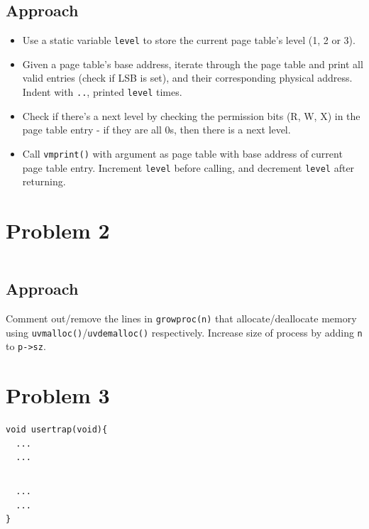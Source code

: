 \documentclass[11pt,a4paper,english]{paper}
\newenvironment{colorboxed}[4][gray]{
\begin{tcolorbox}[colback=#1!3!white,colframe=#1(ryb)!50!black,title=\textbf{#2: #3},#4]
}{
\end{tcolorbox}
}
\begin{document}
\subsection{Approach}
\begin{itemize}[noitemsep, nolistsep]
    \item Use a static variable \texttt{level} to store the current page table's level (1, 2 or 3).
    \item Given a page table's base address, iterate through the page table and print all valid entries (check if LSB is set), and their corresponding physical address. Indent with \texttt{..}, printed \texttt{level} times.
    \item Check if there's a next level by checking the permission bits (R, W, X) in the page table entry - if they are all 0s, then there is a next level.
    \item Call \texttt{vmprint()} with argument as page table with base address of current page table entry. Increment \texttt{level} before calling, and decrement \texttt{level} after returning.
\end{itemize}

\section{Problem 2}
\begin{colorboxed}{Code}{\texttt{kernel/proc.c::growproc()}}{unbreakable}
    \inputminted[baselinestretch=0.85,firstline=232,lastline=248,breaklines]{c}{kernel/proc.c}
\end{colorboxed}
\subsection{Approach}
Comment out/remove the lines in \texttt{growproc(n)} that allocate/deallocate memory using \texttt{uvmalloc()}/\texttt{uvdemalloc()} respectively. Increase size of process by adding \texttt{n} to \texttt{p->sz}.

\section{Problem 3}
\begin{colorboxed}{Code}{\texttt{kernel/trap.c::usertrap()}}{unbreakable}

    \begin{verbatim}
void usertrap(void){
  ...
  ...
    \end{verbatim}
    \vspace{-7.5mm}
    \inputminted[baselinestretch=0.85, breaklines, firstline=65, lastline=76]{c}{kernel/trap.c}
    \vspace{-8.5mm}
    \begin{verbatim}
  ...
  ...
}
    \end{verbatim}
\end{colorboxed}
\end{document}

